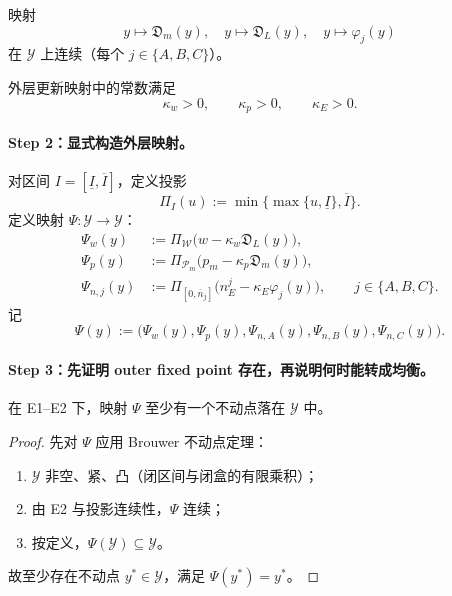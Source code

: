 \begin{assumption}[E2：连续性]
映射
\[
y\mapsto\mathfrak D_m(y),\quad y\mapsto\mathfrak D_L(y),\quad y\mapsto\varphi_j(y)
\]
在 $\mathcal Y$ 上连续（每个 $j\in\{A,B,C\}$）。
\end{assumption}

\begin{assumption}[E3：外层更新步长为正]
外层更新映射中的常数满足
\[
\kappa_w>0,
\qquad
\kappa_p>0,
\qquad
\kappa_E>0.
\]
\end{assumption}

\paragraph{Step 2：显式构造外层映射。}
对区间 $I=[\underline I,\overline I]$，定义投影
\[
\Pi_I(u):=\min\{\max\{u,\underline I\},\overline I\}.
\]
定义映射 $\Psi:\mathcal Y\to\mathcal Y$：
\begin{align}
\Psi_w(y)&:=\Pi_{\mathcal W}\bigl(w-\kappa_w\mathfrak D_L(y)\bigr),
\label{eq:p8zh_psiw}\\
\Psi_p(y)&:=\Pi_{\mathcal P_m}\bigl(p_m-\kappa_p\mathfrak D_m(y)\bigr),
\label{eq:p8zh_psip}\\
\Psi_{n,j}(y)&:=\Pi_{[0,\overline n_j]}\bigl(n_E^j-\kappa_E\varphi_j(y)\bigr),
\qquad j\in\{A,B,C\}.
\label{eq:p8zh_psin}
\end{align}
记
\[
\Psi(y):=\bigl(\Psi_w(y),\Psi_p(y),\Psi_{n,A}(y),\Psi_{n,B}(y),\Psi_{n,C}(y)\bigr).
\]

\paragraph{Step 3：先证明 outer fixed point 存在，再说明何时能转成均衡。}

\begin{proposition}
在 E1--E2 下，映射 $\Psi$ 至少有一个不动点落在 $\mathcal Y$ 中。
\end{proposition}

\begin{proof}
先对 $\Psi$ 应用 Brouwer 不动点定理：
\begin{enumerate}
    \item $\mathcal Y$ 非空、紧、凸（闭区间与闭盒的有限乘积）；
    \item 由 E2 与投影连续性，$\Psi$ 连续；
    \item 按定义，$\Psi(\mathcal Y)\subseteq\mathcal Y$。
\end{enumerate}
\mbox{} 故至少存在不动点 $y^*\in\mathcal Y$，满足 $\Psi(y^*)=y^*$。
\end{proof}

